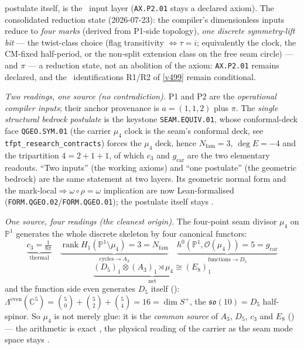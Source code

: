\documentclass[11pt,a4paper]{article}
\newcommand{\cthree}{c_3}
\newcommand{\gcar}{g_{\mathrm{car}}}
\newcommand{\Nfam}{N_{\mathrm{fam}}}
\newcommand{\PP}{\mathbb{P}}
\begin{document}
postulate itself, is the \mO\ input layer (\texttt{AX.P2.01} stays a declared axiom). The consolidated
reduction state (2026-07-23): the compiler's dimensionless inputs reduce to \emph{four marks} (derived
from P1-side topology), \emph{one discrete symmetry-lift bit} --- the twist-class choice (flag
transitivity $\iff\tau=i$; equivalently the clock, the CM-fixed half-period, or the non-split
extension class on the free seam circle) --- and $\pi$ --- a reduction state, not an abolition of the axiom:
\texttt{AX.P2.01} remains declared, and the \mC\
identifications R1/R2 of \vref{v499} remain conditional.
\par\smallskip
\noindent\emph{Two readings, one source (no contradiction).} P1 and P2 are the \emph{operational compiler
inputs}; their anchor provenance is $a=(1,1,2)$ plus $\pi$. The \emph{single structural bedrock postulate}
is the keystone \texttt{SEAM.EQUIV.01}, whose conformal-deck face \texttt{QGEO.SYM.01} (the carrier $\mu_4$
clock is the seam's conformal deck, see
\texttt{tfpt\_research\_contracts}) forces the $\mu_4$ deck, hence $\Nfam=3$, $\deg E=-4$ and the
tripartition $4=2{+}1{+}1$, of which $c_3$ and $\gcar$ are the two elementary readouts. ``Two inputs''
(the working axioms) and ``one postulate'' (the geometric bedrock) are the same statement at two layers.
Its geometric normal form and the mark-local$\Rightarrow\omega\circ\rho=\omega$ implication are now
Lean-formalised (\texttt{FORM.QGEO.02}/\texttt{FORM.QGEO.01}); the postulate itself stays \mO.
\par\smallskip
\noindent\emph{One source, four readings (the cleanest origin).} The four-point seam divisor $\mu_4$ on
$\PP^1$ generates the whole discrete skeleton by four canonical functors:
\[
  \underbrace{\cthree=\tfrac1{8\pi}}_{\text{thermal}}
  \quad
  \underbrace{\operatorname{rank}H_1(\PP^1\!\setminus\!\mu_4)=3=\Nfam}_{\text{cycles}\to A_3}
  \quad
  \underbrace{h^0(\PP^1,\mathcal O(\mu_4))=5=\gcar}_{\text{functions}\to D_5}
\]
\vspace{-3mm}
\[
  \underbrace{(D_5)_1\otimes(A_3)_1\rtimes\mu_4\cong(E_8)_1}_{\text{net}}
\]
and the function side even generates $D_5$ itself ():
$\Lambda^{\mathrm{even}}(\mathbb C^5)=\binom50+\binom52+\binom54=16=\dim S^+$, the $\mathfrak{so}(10)=D_5$
half-spinor. So $\mu_4$ is not merely glue: it is the \emph{common source} of $A_3$, $D_5$, $\cthree$ and
$E_8$ (\veri{v189\_riemann\_roch\_carrier.py}) --- the arithmetic is exact \mE, the physical reading of the
carrier as the seam mode space stays \mC.
\end{document}
